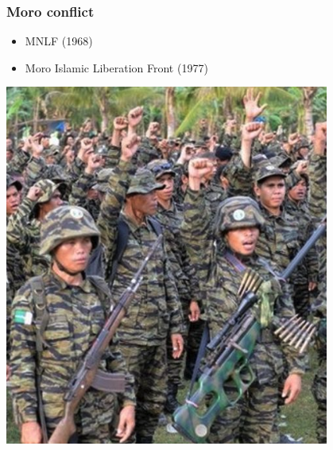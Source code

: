 \documentclass[aspectratio=43]{beamer}
\begin{document}

\begin{frame}
\frametitle{Moro conflict}
\centering

\begin{minipage}{0.38\textwidth}\centering
\begin{itemize}
  \item MNLF (1968)
  \item Moro Islamic Liberation Front (1977)
\end{itemize}

\end{minipage}\hfill
\begin{minipage}{0.6\textwidth}\centering
\includegraphics[width = 0.8\textwidth]{img/moro_fighters}
\end{minipage}



\end{frame}
\end{document}
